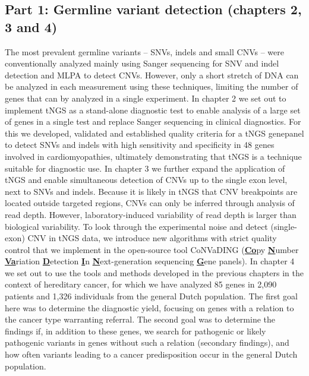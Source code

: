 \subsection[Germline variant detection]{Part 1:  Germline variant detection \newline (chapters 2, 3 and 4)}\label{Part 1}
The most prevalent germline variants – SNVs, indels and small CNVs – were conventionally analyzed mainly using Sanger sequencing for SNV and indel detection and MLPA to detect CNVs. 
However, only a short stretch of DNA can be analyzed in each measurement using these techniques, limiting the number of genes that can by analyzed in a single experiment. 
In chapter 2 we set out to implement tNGS as a stand-alone diagnostic test to enable analysis of a large set of genes in a single test and replace Sanger sequencing in clinical diagnostics. For this we developed, validated and established quality criteria for a tNGS genepanel to detect SNVs and indels with high sensitivity and specificity in 48 genes involved in cardiomyopathies, ultimately demonstrating that tNGS is a technique suitable for diagnostic use. 
In chapter 3 we further expand the application of tNGS and enable simultaneous detection of CNVs up to the single exon level, next to SNVs and indels. 
Because it is likely in tNGS that CNV breakpoints are located outside targeted regions, CNVs can only be inferred through analysis of read depth. 
However, laboratory-induced variability of read depth is larger than biological variability. 
To look through the experimental noise and detect (single-exon) CNV in tNGS data, we introduce new algorithms with strict quality control that we implement in the open-source tool CoNVaDING (\textbf{\underline{Co}}py \textbf{\underline{N}}umber \textbf{\underline{Va}}riation \textbf{\underline{D}}etection \textbf{\underline{I}}n \textbf{\underline{N}}ext-generation sequencing \textbf{\underline{G}}ene panels). 
In chapter 4 we set out to use the tools and methods developed in the previous chapters in the context of hereditary cancer, for which we have analyzed 85 genes in 2,090 patients and 1,326 individuals from the general Dutch population. 
The first goal here was to determine the diagnostic yield, focusing on genes with a relation to the cancer type warranting referral. 
The second goal was to determine the findings if, in addition to these genes, we search for pathogenic or likely pathogenic variants in genes without such a relation (secondary findings), and how often variants leading to a cancer predisposition occur in the general Dutch population. 

